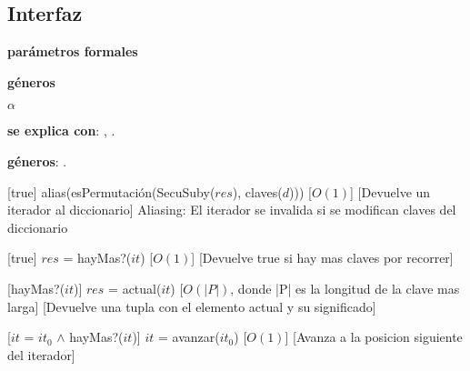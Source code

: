 \begin{Interfaz}
\subsection{Interfaz}

  \textbf{par\'ametros formales}\parindent\\
  \parbox{1.7cm}{\textbf{g\'eneros}} $\alpha$
 
 
  \textbf{se explica con}: , .

  \textbf{g\'eneros}: .


%
[true]
{alias(esPermutaci\'on(SecuSuby($res$), claves($d$)))}%
[$O(1)$] %
[Devuelve un iterador al diccionario]
{Aliasing: El iterador se invalida si se modifican claves del diccionario}

%
[true]
{$res$ = hayMas?($it$)}%
[$O(1)$]
[Devuelve true si hay mas claves por recorrer]

%
[hayMas?($it$)]
{$res$ = actual($it$)}%
[$O(|P|)$, donde |P| es la longitud de la clave mas larga]
[Devuelve una tupla con el elemento actual y su significado]

%
[$it$ = $it_0$ $\land$ hayMas?($it$)]
{$it$ = avanzar($it_0$)}%
[$O(1)$]
[Avanza a la posicion siguiente del iterador]



\end{Interfaz}



